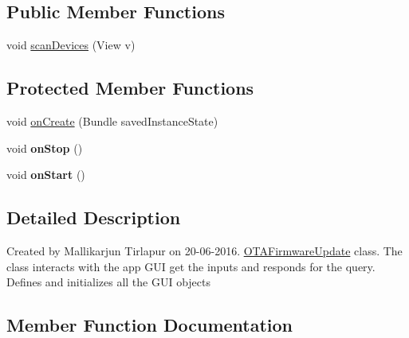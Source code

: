 \subsection*{Public Member Functions}
\begin{DoxyCompactItemize}
\item 
void \hyperlink{classcom_1_1hobby_1_1smart_1_1bluetoothcomm_1_1_o_t_a_firmware_update_ac20ac5be70b412d1b4afacd39decdf06}{scan\+Devices} (View v)
\end{DoxyCompactItemize}
\subsection*{Protected Member Functions}
\begin{DoxyCompactItemize}
\item 
void \hyperlink{classcom_1_1hobby_1_1smart_1_1bluetoothcomm_1_1_o_t_a_firmware_update_ac1da9ccafc28943f6db5e8e5e0685be5}{on\+Create} (Bundle saved\+Instance\+State)
\item 
\mbox{\label{classcom_1_1hobby_1_1smart_1_1bluetoothcomm_1_1_o_t_a_firmware_update_a890e5768a591dc366226b02336f66ef6}} 
void {\bfseries on\+Stop} ()
\item 
\mbox{\label{classcom_1_1hobby_1_1smart_1_1bluetoothcomm_1_1_o_t_a_firmware_update_abfe667c242b19c2c8f06ffffd8594d09}} 
void {\bfseries on\+Start} ()
\end{DoxyCompactItemize}


\subsection{Detailed Description}
Created by Mallikarjun Tirlapur on 20-\/06-\/2016. \hyperlink{classcom_1_1hobby_1_1smart_1_1bluetoothcomm_1_1_o_t_a_firmware_update}{O\+T\+A\+Firmware\+Update} class. The class interacts with the app G\+UI get the inputs and responds for the query. Defines and initializes all the G\+UI objects 

\subsection{Member Function Documentation}
\mbox{\label{classcom_1_1hobby_1_1smart_1_1bluetoothcomm_1_1_o_t_a_firmware_update_ac1da9ccafc28943f6db5e8e5e0685be5}} 
